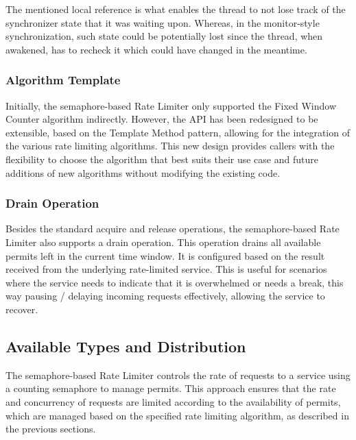 The mentioned local reference is what
enables the thread to not lose track of the synchronizer state that it was waiting upon.
Whereas, in the monitor-style synchronization, such state could be potentially lost since the thread,
when awakened, has to recheck it which could have changed in the meantime.

\subsubsection{Algorithm Template}\label{subsubsec:rate-limiter-algorithm-template}

Initially, the semaphore-based Rate Limiter only supported the Fixed Window Counter algorithm indirectly.
However, the API has been redesigned to be extensible, based on the Template Method pattern,
allowing for the integration of the various rate limiting algorithms.
This new design provides callers with the flexibility to choose the algorithm that best suits their use case
and future additions of new algorithms without modifying the existing code.

\subsubsection{Drain Operation}\label{subsubsec:rate-limiter-drain-operation}

Besides the standard acquire and release operations, the semaphore-based Rate Limiter also supports a drain operation.
This operation drains all available permits left in the current time window.
It is configured based on the result received from the underlying rate-limited service.
This is useful for scenarios where the service needs to indicate that it is overwhelmed or needs a break,
this way pausing / delaying incoming requests effectively, allowing the service to recover.

\subsection{Available Types and Distribution}\label{subsec:rate-limiter-types-distribution}

The semaphore-based Rate Limiter controls the rate of requests to a service
using a counting semaphore to manage permits.
This approach ensures that the rate and concurrency of requests are limited according to the availability of permits,
which are managed based on the specified rate limiting algorithm,
as described in the previous sections.

